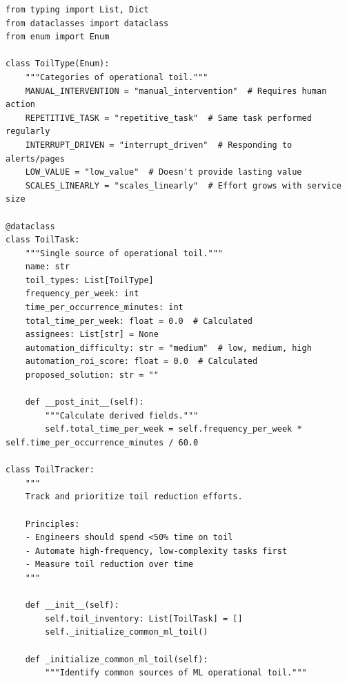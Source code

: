 \begin{lstlisting}[style=python, caption={Toil identification and reduction framework}]
from typing import List, Dict
from dataclasses import dataclass
from enum import Enum

class ToilType(Enum):
    """Categories of operational toil."""
    MANUAL_INTERVENTION = "manual_intervention"  # Requires human action
    REPETITIVE_TASK = "repetitive_task"  # Same task performed regularly
    INTERRUPT_DRIVEN = "interrupt_driven"  # Responding to alerts/pages
    LOW_VALUE = "low_value"  # Doesn't provide lasting value
    SCALES_LINEARLY = "scales_linearly"  # Effort grows with service size

@dataclass
class ToilTask:
    """Single source of operational toil."""
    name: str
    toil_types: List[ToilType]
    frequency_per_week: int
    time_per_occurrence_minutes: int
    total_time_per_week: float = 0.0  # Calculated
    assignees: List[str] = None
    automation_difficulty: str = "medium"  # low, medium, high
    automation_roi_score: float = 0.0  # Calculated
    proposed_solution: str = ""

    def __post_init__(self):
        """Calculate derived fields."""
        self.total_time_per_week = self.frequency_per_week * self.time_per_occurrence_minutes / 60.0

class ToilTracker:
    """
    Track and prioritize toil reduction efforts.

    Principles:
    - Engineers should spend <50% time on toil
    - Automate high-frequency, low-complexity tasks first
    - Measure toil reduction over time
    """

    def __init__(self):
        self.toil_inventory: List[ToilTask] = []
        self._initialize_common_ml_toil()

    def _initialize_common_ml_toil(self):
        """Identify common sources of ML operational toil."""


\end{lstlisting}
